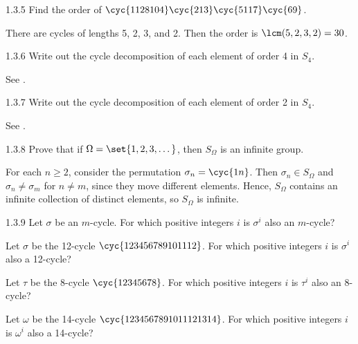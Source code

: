 \begin{exercise}{1.3.5}
    Find the order of $\cyc{1 12 8 10 4}\cyc{2 13}\cyc{5 11 7}\cyc{6 9}$.
\end{exercise}

\begin{sol}
    There are cycles of lengths 5, 2, 3, and 2.
	Then the order is $\lcm(5, 2, 3, 2) = 30$.
\end{sol}

\begin{exercise}{1.3.6}
    Write out the cycle decomposition of each element of order 4 in $S_4$.
\end{exercise}

\begin{sol}
    See .
\end{sol}

\begin{exercise}{1.3.7}
    Write out the cycle decomposition of each element of order 2 in $S_4$.
\end{exercise}

\begin{sol}
    See .
\end{sol}

\begin{exercise}{1.3.8}
    Prove that if $\Omega = \set{1,2,3,\dots}$, then $S_\Omega$ is an infinite group.

\end{exercise}

\begin{sol}
    For each $n \geq 2$, consider the permutation $\sigma_n = \cyc{1 n}$.
	Then $\sigma_n \in S_\Omega$ and $\sigma_n \neq \sigma_m$ for $n \neq m$, since they move different elements.
	Hence, $S_{\Omega}$ contains an infinite collection of distinct elements, so $S_\Omega$ is infinite.
\end{sol}

\begin{exercise}{1.3.9}
     Let $\sigma$ be an $m$-cycle.
	For which positive integers $i$ is $\sigma^i$ also an $m$-cycle?
    \begin{subexercises}
        \item Let $\sigma$ be the 12-cycle $\cyc{1 2 3 4 5 6 7 8 9 10 11 12}$.
        For which positive integers $i$ is $\sigma^i$ also a 12-cycle?
        \item Let $\tau$ be the 8-cycle $\cyc{1 2 3 4 5 6 7 8}$.
        For which positive integers $i$ is $\tau^i$ also an 8-cycle?
        \item Let $\omega$ be the 14-cycle $\cyc{1 2 3 4 5 6 7 8 9 10 11 12 13 14}$.
        For which positive integers $i$ is $\omega^i$ also a 14-cycle?
    \end{subexercises}
\end{exercise}

